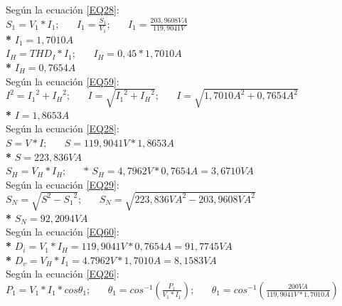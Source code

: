 Según la ecuación \ref{EQ28}:\\

$S_{1} = V_{1}*I_{1}; \;\;\;\;\;\;
I_{1} = \frac{S_{1}}{V_{1}}; \;\;\;\;\;\;
I_{1} = \frac{203,9608VA}{119,9041V}$\\

\textbf{* }$I_{1} = 1,7010A$\\

$I_{H} = THD_{I} * I_{1}; \;\;\;\;\;\;
I_{H} = 0,45 * 1,7010A$\\

\textbf{* }$I_{H} = 0,7654A$\\

Según la ecuación \ref{EQ59}:\\

$I^2 = {I_{1}}^2 + {I_{H}}^2; \;\;\;\;\;\;
I = \sqrt{{I_{1}}^2 + {I_{H}}^2}; \;\;\;\;\;\;
I = \sqrt{{1,7010A}^2 + {0,7654A}^2}$\\

\textbf{* }$I = 1,8653A$\\

Según la ecuación \ref{EQ28}: \\

$S = V*I; \;\;\;\;\;\;
S = 119,9041V * 1,8653A$\\

\textbf{* }$S = 223,836VA$\\

$S_{H} = V_{H}*I_{H}; \;\;\;\;\;\;
\textbf{* }S_{H} = 4,7962V * 0,7654A = 3,6710VA$\\

Según la ecuación \ref{EQ29}: \\

$S_{N} = \sqrt{{S}^2 - {{S}_{1}}^2}; \;\;\;\;\;\;
S_{N} =  \sqrt{{223,836VA}^2 - {203,9608VA}^2}$\\

\textbf{* }$S_{N} = 92,2094VA$\\

Según la ecuación \ref{EQ60}: \\

\textbf{* }$D_{i} = V_{1}*I_{H} = 119,9041V * 0,7654A = 91,7745VA$\\

\textbf{* }$D_{v} = V_{H}*I_{1} = 4.7962V *1,7010A = 8,1583VA$\\

Según la ecuación \ref{EQ26}: \\

$P_{1} = V_{1}*I_{1}*cos \theta_{1}; \;\;\;\;\;\; 
\theta_{1} =  cos^{-1}(\frac{P_{1}}{V_{1}*I_{1}}); \;\;\;\;\;\; 
\theta_{1} =  cos^{-1}(\frac{200VA}{119,9041V*1,7010A})$\\

